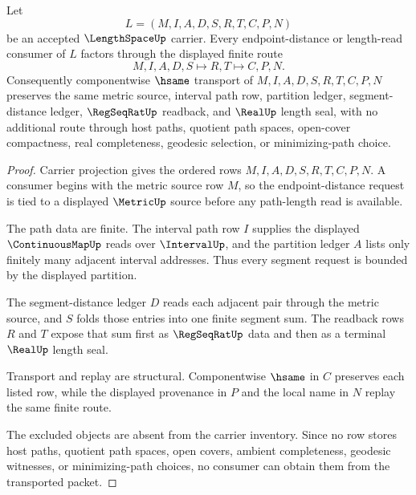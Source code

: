 \begin{theorem}
\label{thm:length-space-path-ledger-stability}
Let
$$
L=(M,I,A,D,S,R,T,C,P,N)
$$
be an accepted $\LengthSpaceUp$ carrier. Every endpoint-distance or length-read consumer of $L$ factors through the displayed finite route
$$
M,I,A,D,S \longmapsto R,T \longmapsto C,P,N .
$$
Consequently componentwise $\hsame$ transport of $M,I,A,D,S,R,T,C,P,N$ preserves the same metric source, interval path row, partition ledger, segment-distance ledger, $\RegSeqRatUp$ readback, and $\RealUp$ length seal, with no additional route through host paths, quotient path spaces, open-cover compactness, real completeness, geodesic selection, or minimizing-path choice.
\end{theorem}
\begin{proof}
Carrier projection gives the ordered rows $M,I,A,D,S,R,T,C,P,N$. A consumer begins with the metric source row $M$, so the endpoint-distance request is tied to a displayed $\MetricUp$ source before any path-length read is available.

The path data are finite. The interval path row $I$ supplies the displayed $\ContinuousMapUp$ reads over $\IntervalUp$, and the partition ledger $A$ lists only finitely many adjacent interval addresses. Thus every segment request is bounded by the displayed partition.

The segment-distance ledger $D$ reads each adjacent pair through the metric source, and $S$ folds those entries into one finite segment sum. The readback rows $R$ and $T$ expose that sum first as $\RegSeqRatUp$ data and then as a terminal $\RealUp$ length seal.

Transport and replay are structural. Componentwise $\hsame$ in $C$ preserves each listed row, while the displayed provenance in $P$ and the local name in $N$ replay the same finite route.

The excluded objects are absent from the carrier inventory. Since no row stores host paths, quotient path spaces, open covers, ambient completeness, geodesic witnesses, or minimizing-path choices, no consumer can obtain them from the transported packet.
\end{proof}

